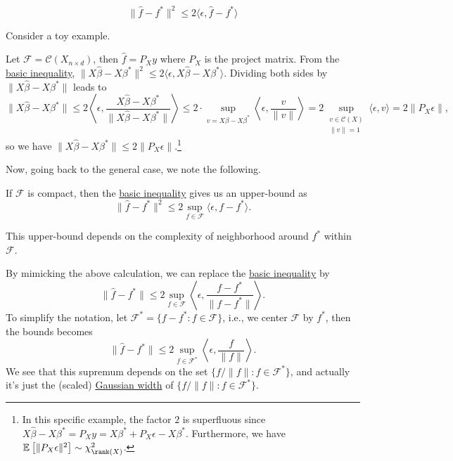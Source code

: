 \begin{equation}\label{eq:basic-inequality}
	\lVert \hat{f} - f^{\ast}  \rVert ^2 \leq 2 \langle \epsilon , \hat{f} - f^{\ast} \rangle
\end{equation}

Consider a toy example.

\begin{eg}
	Let \(\mathscr{F} = \mathcal{C} (X_{n\times d})\), then \(\hat{f} = P_X y\) where \(P_X\) is the project matrix. From the \hyperref[eq:basic-inequality]{basic inequality}, \(\lVert X \hat{\beta} - X \beta ^{\ast}  \rVert ^2 \leq 2 \langle \epsilon , X \hat{\beta} - X \beta ^{\ast} \rangle\). Dividing both sides by \(\lVert X \hat{\beta} - X \beta ^{\ast} \rVert \) leads to
	\[
		\lVert X \hat{\beta} - X \beta ^{\ast} \rVert \leq 2 \left\langle \epsilon , \frac{X \hat{\beta} - X \beta ^{\ast}}{\lVert X \hat{\beta} - X \beta ^{\ast} \rVert } \right\rangle
		\leq 2\cdot \sup _{v = X \beta - X \beta ^{\ast} } \left\langle \epsilon , \frac{v}{\lVert v \rVert } \right\rangle
		= 2 \sup _{\substack{v\in \mathcal{C} (X) \\ \lVert v \rVert = 1}} \langle \epsilon , v \rangle
		= 2 \lVert P_X \epsilon  \rVert,
	\]
	so we have \(\lVert X \hat{\beta} - X \beta ^{\ast} \rVert \leq 2 \lVert P_X \epsilon \rVert \).\footnote{In this specific example, the factor \(2\) is superfluous since \(X \hat{\beta} - X \beta ^{\ast} = P_X y = X \beta ^{\ast} + P_X \epsilon - X \beta ^{\ast} \). Furthermore, we have \(\mathbb{E}_{}\left[ \lVert P_X \epsilon \rVert ^2 \right] \sim \chi ^2_{\rank (X)}\).}
\end{eg}

Now, going back to the general case, we note the following.

\begin{note}
	If \(\mathscr{F} \) is compact, then the \hyperref[eq:basic-inequality]{basic inequality} gives us an upper-bound as
	\[
		\lVert \hat{f} - f^{\ast} \rVert ^2 \leq 2 \sup _{f\in \mathscr{F} } \langle \epsilon , f - f^{\ast} \rangle.
	\]
\end{note}

\begin{intuition}
	This upper-bound depends on the complexity of neighborhood around \(f^{\ast} \) within \(\mathscr{F} \).
\end{intuition}

By mimicking the above calculation, we can replace the \hyperref[eq:basic-inequality]{basic inequality} by
\[
	\lVert \hat{f} - f^{\ast} \rVert \leq 2 \sup _{f\in \mathscr{F} } \left\langle \epsilon , \frac{f - f^{\ast} }{\lVert f - f^{\ast} \rVert } \right\rangle .
\]
To simplify the notation, let \(\mathscr{F} ^{\ast} = \{ f - f^{\ast} \colon f \in \mathscr{F} \} \), i.e., we center \(\mathscr{F} \) by \(f^{\ast} \), then the bounds becomes
\[
	\lVert \hat{f} - f^{\ast} \rVert \leq 2 \sup _{f\in \mathscr{F} ^{\ast} } \left\langle \epsilon , \frac{f}{\lVert f \rVert } \right\rangle .
\]
We see that this supremum depends on the set \(\{ f / \lVert f \rVert \colon f\in \mathscr{F} ^{\ast} \} \), and actually it's just the (scaled) \hyperref[def:Gaussian-width]{Gaussian width} of \(\{ f / \lVert f \rVert \colon f\in \mathscr{F} ^{\ast} \}\).

